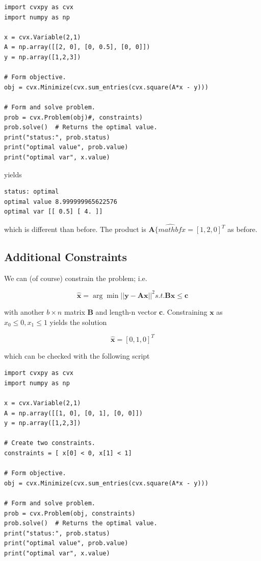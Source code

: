 \begin{verbatim}
import cvxpy as cvx
import numpy as np

x = cvx.Variable(2,1)
A = np.array([[2, 0], [0, 0.5], [0, 0]])
y = np.array([1,2,3])

# Form objective.
obj = cvx.Minimize(cvx.sum_entries(cvx.square(A*x - y)))

# Form and solve problem.
prob = cvx.Problem(obj)#, constraints)
prob.solve()  # Returns the optimal value.
print("status:", prob.status)
print("optimal value", prob.value)
print("optimal var", x.value)
\end{verbatim}

yields

\begin{verbatim}
status: optimal
optimal value 8.999999965622576
optimal var [[ 0.5] [ 4. ]]
\end{verbatim}

which is different than before. The product is \(\mathbf{A}\hat{\{mathbf{x}} = [1,2,0]^T\) as before.

\subsection{Additional Constraints}

We can (of course) constrain the problem; i.e.

\[
\hat{\mathbf{x}} = \arg \min || \mathbf{y} - \mathbf{Ax} ||^2 s.t. \mathbf{Bx} \leq \mathbf{c}
\]

with another \(b \times n\) matrix \(\mathbf{B}\) and length-n vector \(\mathbf{c}\). Constraining \(\mathbf{x}\) as \(x_0 \leq 0, x_1 \leq 1\) yields the solution

\[
\hat{\mathbf{x}} = [0, 1, 0]^T
\]

which can be checked with the following script

\begin{verbatim}
import cvxpy as cvx
import numpy as np

x = cvx.Variable(2,1)
A = np.array([[1, 0], [0, 1], [0, 0]])
y = np.array([1,2,3])

# Create two constraints.
constraints = [ x[0] < 0, x[1] < 1]

# Form objective.
obj = cvx.Minimize(cvx.sum_entries(cvx.square(A*x - y)))

# Form and solve problem.
prob = cvx.Problem(obj, constraints)
prob.solve()  # Returns the optimal value.
print("status:", prob.status)
print("optimal value", prob.value)
print("optimal var", x.value)
\end{verbatim}

